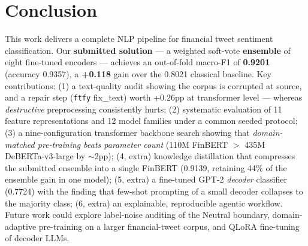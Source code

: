 \documentclass[11pt,a4paper]{article}
\begin{document}
\section{Conclusion}
This work delivers a complete NLP pipeline for financial tweet sentiment classification. Our
\textbf{submitted solution} --- a weighted soft-vote \textbf{ensemble} of eight fine-tuned
encoders --- achieves an out-of-fold macro-F1 of \textbf{0.9201} (accuracy 0.9357), a
\textbf{+0.118} gain over the 0.8021 classical baseline. Key contributions: (1) a text-quality audit
showing the corpus is corrupted at source, and a repair step (\texttt{ftfy} fix\_text) worth
+0.26pp at transformer level --- whereas \emph{destructive} preprocessing consistently hurts;
(2) systematic evaluation of 11 feature representations and 12 model families under a common
seeded protocol; (3) a nine-configuration transformer backbone search showing that
\emph{domain-matched pre-training beats parameter count} (110M FinBERT $>$ 435M DeBERTa-v3-large
by $\sim$2pp); (4, extra) knowledge distillation that compresses the submitted ensemble into a single
FinBERT (0.9139, retaining 44\% of the ensemble gain in one model); (5, extra) a
fine-tuned GPT-2 \emph{decoder} classifier (0.7724) with the finding that few-shot prompting of a
small decoder collapses to the majority class; (6, extra) an explainable, reproducible agentic
workflow. Future work could explore label-noise auditing of the Neutral boundary, domain-adaptive
pre-training on a larger financial-tweet corpus, and QLoRA fine-tuning of decoder LLMs.

\end{document}
